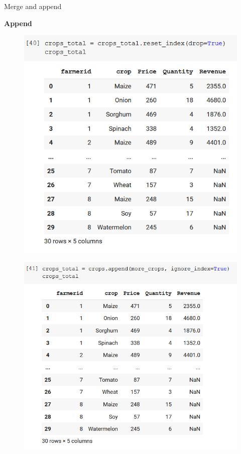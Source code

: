 \documentclass[aspectratio=169]{beamer}
\begin{document}
\begin{frame}{Merge and append}

	\textbf{Append}

	\begin{multicols}{2}

		\begin{figure}
			\centering
			\includegraphics[width=0.87\linewidth]{img/crops_total_reset_index.png}
		\end{figure}

		\begin{figure}
			\centering
			\includegraphics[width=\linewidth]{img/crops_total_ignore_index.png}
		\end{figure}

	\end{multicols}

\end{frame}
\end{document}
